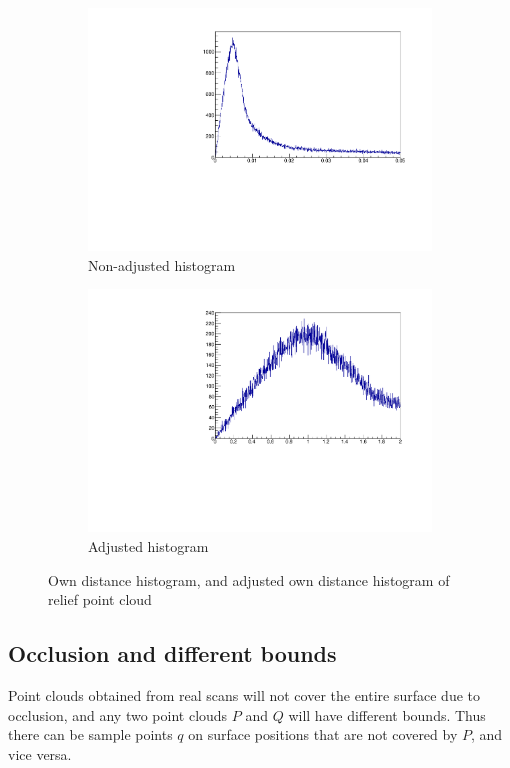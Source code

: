 \begin{figure}[p]
\begin{subfigure}{.5\textwidth}
	\includegraphics[width=\linewidth]{fig/relief_noadj.pdf}
	\caption{Non-adjusted histogram}
\end{subfigure}%
\begin{subfigure}{.5\textwidth}
	\includegraphics[width=\linewidth]{fig/relief_adj.pdf}
	\caption{Adjusted histogram}
\end{subfigure}
\caption{Own distance histogram, and adjusted own distance histogram of relief point cloud}
\label{fig:relief_adj}
\end{figure}




\subsection{Occlusion and different bounds}
Point clouds obtained from real scans will not cover the entire surface due to occlusion, and any two point clouds $P$ and $Q$ will have different bounds. Thus there can be sample points $q$ on surface positions that are not covered by $P$, and vice versa.

